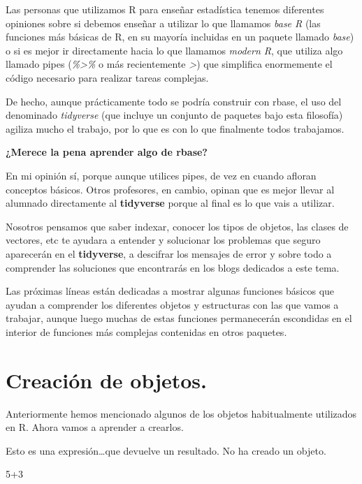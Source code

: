 \documentclass[
  letterpaper,
  DIV=11,
  numbers=noendperiod]{scrreprt}
\newenvironment{Shaded}{\begin{snugshade}}{\end{snugshade}}
\newcommand{\DecValTok}[1]{\textcolor[rgb]{0.68,0.00,0.00}{#1}}
\newcommand{\SpecialCharTok}[1]{\textcolor[rgb]{0.37,0.37,0.37}{#1}}
\begin{document}
Las personas que utilizamos R para enseñar estadística tenemos
diferentes opiniones sobre si debemos enseñar a utilizar lo que llamamos
\emph{base R} (las funciones más básicas de R, en su mayoría incluidas
en un paquete llamado \emph{base}) o si es mejor ir directamente hacia
lo que llamamos \emph{modern R}, que utiliza algo llamado pipes
(\emph{\%\textgreater\%} o más recientemente
\emph{\textbar\textgreater{}}) que simplifica enormemente el código
necesario para realizar tareas complejas.

De hecho, aunque prácticamente todo se podría construir con rbase, el
uso del denominado \emph{tidyverse} (que incluye un conjunto de paquetes
bajo esta filosofía) agiliza mucho el trabajo, por lo que es con lo que
finalmente todos trabajamos.

\textbf{¿Merece la pena aprender algo de rbase?}

En mi opinión sí, porque aunque utilices pipes, de vez en cuando afloran
conceptos básicos. Otros profesores, en cambio, opinan que es mejor
llevar al alumnado directamente al \textbf{tidyverse} porque al final es
lo que vais a utilizar.

Nosotros pensamos que saber indexar, conocer los tipos de objetos, las
clases de vectores, etc te ayudara a entender y solucionar los problemas
que seguro aparecerán en el \textbf{tidyverse}, a descifrar los mensajes
de error y sobre todo a comprender las soluciones que encontrarás en los
blogs dedicados a este tema.

Las próximas líneas están dedicadas a mostrar algunas funciones básicos
que ayudan a comprender los diferentes objetos y estructuras con las que
vamos a trabajar, aunque luego muchas de estas funciones permanecerán
escondidas en el interior de funciones más complejas contenidas en otros
paquetes.

\hypertarget{creaciuxf3n-de-objetos.}{%
\section{Creación de objetos.}\label{creaciuxf3n-de-objetos.}}

Anteriormente hemos mencionado algunos de los objetos habitualmente
utilizados en R. Ahora vamos a aprender a crearlos.

Esto es una expresión\ldots que devuelve un resultado. No ha creado un
objeto.

\begin{Shaded}
\begin{Highlighting}[]
\DecValTok{5}\SpecialCharTok{+}\DecValTok{3}
\end{Highlighting}
\end{Shaded}
\end{document}
